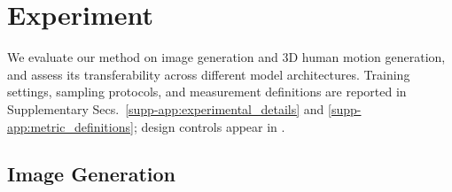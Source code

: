 \section{Experiment}
\label{sec:experiments}

We evaluate our method on image generation and 3D human motion generation, and assess its transferability across different model architectures. Training settings, sampling protocols, and measurement definitions are reported in Supplementary Secs.~\ref{supp-app:experimental_details} and \ref{supp-app:metric_definitions}; design controls appear in .

\subsection{Image Generation}
\label{sec:image_generation}
\label{sec:experimental_setup}

